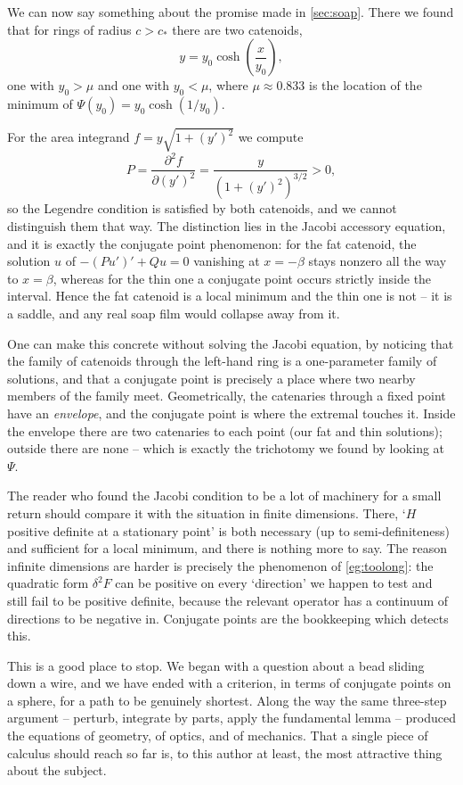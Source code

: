 \documentclass[a4paper]{scrartcl}
\begin{document}
\begin{example}
	We can now say something about the promise made in \autoref{sec:soap}. There we found that for rings of radius $c > c_*$ there are two catenoids,
	$$
	y = y_0 \cosh\left(\frac{x}{y_0}\right),
	$$
	one with $y_0 > \mu$ and one with $y_0 < \mu$, where $\mu \approx 0.833$ is the location of the minimum of $\Psi(y_0) = y_0\cosh(1/y_0)$.

	For the area integrand $f = y\sqrt{1 + (y')^2}$ we compute
	$$
	P = \frac{\partial^2 f}{\partial (y')^2} = \frac{y}{\left(1 + (y')^2\right)^{3/2}} > 0,
	$$
	so the Legendre condition is satisfied by both catenoids, and we cannot distinguish them that way. The distinction lies in the Jacobi accessory equation, and it is exactly the conjugate point phenomenon: for the fat catenoid, the solution $u$ of $-(Pu')' + Qu = 0$ vanishing at $x = -\beta$ stays nonzero all the way to $x = \beta$, whereas for the thin one a conjugate point occurs strictly inside the interval. Hence the fat catenoid is a local minimum and the thin one is not -- it is a saddle, and any real soap film would collapse away from it.

	One can make this concrete without solving the Jacobi equation, by noticing that the family of catenoids through the left-hand ring is a one-parameter family of solutions, and that a conjugate point is precisely a place where two nearby members of the family meet. Geometrically, the catenaries through a fixed point have an \emph{envelope}, and the conjugate point is where the extremal touches it. Inside the envelope there are two catenaries to each point (our fat and thin solutions); outside there are none -- which is exactly the trichotomy we found by looking at $\Psi$.
\end{example}

\begin{remark}
	The reader who found the Jacobi condition to be a lot of machinery for a small return should compare it with the situation in finite dimensions. There, `$H$ positive definite at a stationary point' is both necessary (up to semi-definiteness) and sufficient for a local minimum, and there is nothing more to say. The reason infinite dimensions are harder is precisely the phenomenon of \autoref{eg:toolong}: the quadratic form $\delta^2 F$ can be positive on every `direction' we happen to test and still fail to be positive definite, because the relevant operator has a continuum of directions to be negative in. Conjugate points are the bookkeeping which detects this.
\end{remark}

This is a good place to stop. We began with a question about a bead sliding down a wire, and we have ended with a criterion, in terms of conjugate points on a sphere, for a path to be genuinely shortest. Along the way the same three-step argument -- perturb, integrate by parts, apply the fundamental lemma -- produced the equations of geometry, of optics, and of mechanics. That a single piece of calculus should reach so far is, to this author at least, the most attractive thing about the subject.
\end{document}
